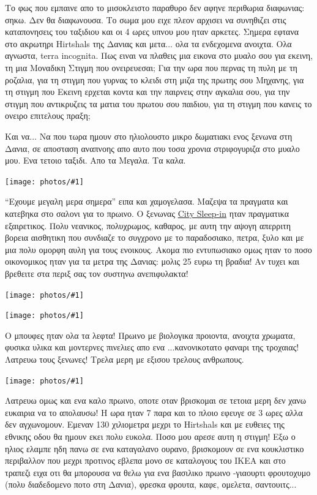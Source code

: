 \documentclass[11pt, letterpaper]{book}
\newcommand\photo[1]{\begin{center}\noindent\texttt{[image: photos/\#1]}\end{center}}
\begin{document}
Το φως που εμπαινε απο το μισοκλειστο παραθυρο δεν αφηνε περιθωρια διαφωνιας: σηκω.
Δεν θα διαφωνουσα. Το σωμα μου ειχε πλεον αρχισει να συνηθιζει στις καταπονησεις του ταξιδιου και οι 4 ωρες υπνου μου ηταν αρκετες.
Σημερα εφτανα στο ακρωτηρι Hirtshals της Δανιας και μετα... ολα τα ενδεχομενα ανοιχτα. Ολα αγνωστα, terra incognita.
Πως ειναι να πλαθεις μια εικονα στο μυαλο σου για εκεινη, τη μια Μοναδικη Στιγμη που ονειρευεσαι; Για την ωρα που περνας τη πυλη με τη ροζαλια, για τη στιγμη που γυρνας το κλειδι στη μιζα της πρωτης σου Μηχανης, για τη στιγμη που Εκεινη ερχεται κοντα και την παιρνεις στην αγκαλια σου, για την στιγμη που αντικρυζεις τα ματια του πρωτου σου παιδιου, για τη στιγμη που κανεις το ονειρο επιτελους πραξη;

Και να... Να που τωρα ημουν στο ηλιολουστο μικρο δωματιακι ενος ξενωνα στη Δανια, σε αποσταση αναπνοης απο αυτο που τοσα χρονια στριφογυριζα στο μυαλο μου. Ενα τετοιο ταξιδι. Απο τα Μεγαλα. Τα καλα.

\photo{136.jpg}

``Εχουμε μεγαλη μερα σημερα'' ειπα και χαμογελασα. Μαζεψα τα πραγματα και κατεβηκα στο σαλονι για το πρωινο. 
Ο ξενωνας \href{http://www.citysleep-in.dk/}{City Sleep-in} ηταν πραγματικα εξαιρετικος. Πολυ νεανικος, πολυχρωμος, καθαρος, με αυτη την αψογη απερριτη βορεια αισθητικη που συνδιαζε το συγχρονο με το παραδοσιακο, πετρα, ξυλο και με μια πολυ ομορφη αυλη για τους ενοικους. 
Ακομα πιο εντυπωσιακο ομως ηταν το ποσο οικονομικος ηταν για τα μετρα της Δανιας: μολις 25 ευρω τη βραδια! 
Αν τυχει και βρεθειτε στα περιξ σας τον συστηνω ανεπιφυλακτα!

\photo{137.jpg}
\photo{138.jpg}

Ο μπουφες ηταν ολα τα λεφτα! Πρωινο με βιολογικα προιοντα, ανοιχτα χρωματα, φυσικα υλικα και μοντερνες πινελιες απο ενα ...κανονικοτατο φαναρι της τροχαιας! Λατρευω τους ξενωνες! Τρελα μερη με εξισου τρελους ανθρωπους.

\photo{139.jpg}

Λατρευω ομως και ενα καλο πρωινο, οποτε οταν βρισκομαι σε τετοια μερη δεν χανω ευκαιρια να το απολαυσω! 
Η ωρα ηταν 7 παρα και το πλοιο εφευγε σε 3 ωρες αλλα δεν αγχωνομουν. Εμεναν 130 χιλιομετρα μεχρι το Hirtshals και με ευθειες της εθνικης οδου θα ημουν εκει πολυ ευκολα. 
Ποσο μου αρεσε αυτη η στιγμη! Εξω ο ηλιος ελαμπε ηδη πανω σε ενα καταγαλανο ουρανο, βρισκομουν σε ενα κουκλιστικο περιβαλλον που μεχρι προτινος εβλεπα μονο σε καταλογους του ΙΚΕΑ και στο τραπεζι ειχα οτι θα μπορουσα να θελω για ενα βασιλικο πρωινο -γιαουρτι φρουτοχυμο (πολυ διαδεδομενο ποτο στη Δανια), φρεσκα φρουτα, καφε, ομελετα, σαντουιτς...
\end{document}
